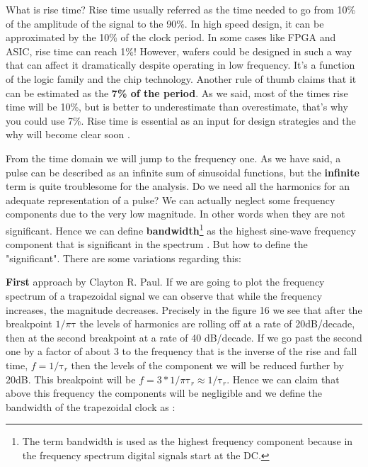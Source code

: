 \documentclass[final]{cubedoc}
\begin{document}
	What is rise time? Rise time usually referred as the time needed to go from 10\% of the amplitude of the signal to the 90\%.
	In high speed design, it can be approximated by the 10\% of the clock period. In some cases like FPGA and ASIC, rise time can reach 1\%! However, wafers could be designed in such a way that can affect it dramatically despite operating in low frequency. It's a function of the logic family and the chip technology.
	Another rule of thumb claims that it can be estimated as the\textbf{ 7\% of the period}. As we said, most of the times rise time will be 10\%, but is better to underestimate than overestimate, that's why you could use 7\%. Rise time is essential as an input for design strategies and the why will become clear soon \cite{bogatin2009signal}.
	
	
	From the time domain we will jump to the frequency one. As we have said, a pulse can be described as an infinite sum of sinusoidal functions, but the \textbf{infinite} term is quite troublesome for the analysis. Do we need all the harmonics for an adequate representation of a pulse? We can actually neglect some frequency components due to the very low magnitude. In other words when they are not significant. Hence we can define \textbf{bandwidth}\footnote{The term bandwidth is used as the highest frequency component because in the frequency spectrum digital signals start at the DC.} as the highest sine-wave frequency component that is significant in the spectrum \cite{bogatin2009signal}. But how to define the "significant". There are some variations regarding this:
	
	\textbf{First} approach by Clayton R. Paul. If we are going to plot the frequency spectrum of a trapezoidal signal we can observe that while the frequency increases, the magnitude decreases. Precisely in the figure 16 we see that after the breakpoint $1/\pi\text{τ}$ the levels of harmonics are rolling off at a rate of 20dB/decade, then at the second breakpoint at a rate of 40 dB/decade. If we go past the second one by a factor of about 3 to the frequency that is the inverse of the rise and fall time, $f = 1/\text{τ}_r$ then the levels of the component we will be reduced further by 20dB. This breakpoint will be $f = 3 * 1/\pi\text{τ}_r \approx 1/\text{τ}_r$.  Hence we can claim that above this frequency the components will be negligible and we define the bandwidth of the trapezoidal clock as \cite{paul2011transmission}:
	
\end{document}
